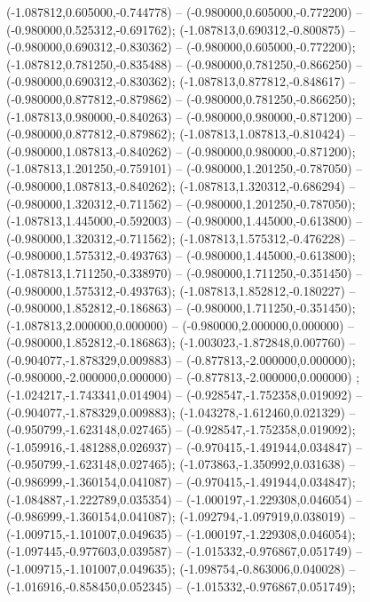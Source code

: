  (-1.087812,0.605000,-0.744778) -- (-0.980000,0.605000,-0.772200) -- (-0.980000,0.525312,-0.691762);
 (-1.087813,0.690312,-0.800875) -- (-0.980000,0.690312,-0.830362) -- (-0.980000,0.605000,-0.772200);
 (-1.087812,0.781250,-0.835488) -- (-0.980000,0.781250,-0.866250) -- (-0.980000,0.690312,-0.830362);
 (-1.087813,0.877812,-0.848617) -- (-0.980000,0.877812,-0.879862) -- (-0.980000,0.781250,-0.866250);
 (-1.087813,0.980000,-0.840263) -- (-0.980000,0.980000,-0.871200) -- (-0.980000,0.877812,-0.879862);
 (-1.087813,1.087813,-0.810424) -- (-0.980000,1.087813,-0.840262) -- (-0.980000,0.980000,-0.871200);
 (-1.087813,1.201250,-0.759101) -- (-0.980000,1.201250,-0.787050) -- (-0.980000,1.087813,-0.840262);
 (-1.087813,1.320312,-0.686294) -- (-0.980000,1.320312,-0.711562) -- (-0.980000,1.201250,-0.787050);
 (-1.087813,1.445000,-0.592003) -- (-0.980000,1.445000,-0.613800) -- (-0.980000,1.320312,-0.711562);
 (-1.087813,1.575312,-0.476228) -- (-0.980000,1.575312,-0.493763) -- (-0.980000,1.445000,-0.613800);
 (-1.087813,1.711250,-0.338970) -- (-0.980000,1.711250,-0.351450) -- (-0.980000,1.575312,-0.493763);
 (-1.087813,1.852812,-0.180227) -- (-0.980000,1.852812,-0.186863) -- (-0.980000,1.711250,-0.351450);
 (-1.087813,2.000000,0.000000) -- (-0.980000,2.000000,0.000000) -- (-0.980000,1.852812,-0.186863);
 (-1.003023,-1.872848,0.007760) -- (-0.904077,-1.878329,0.009883) -- (-0.877813,-2.000000,0.000000);
 (-0.980000,-2.000000,0.000000) -- (-0.877813,-2.000000,0.000000) ;
 (-1.024217,-1.743341,0.014904) -- (-0.928547,-1.752358,0.019092) -- (-0.904077,-1.878329,0.009883);
 (-1.043278,-1.612460,0.021329) -- (-0.950799,-1.623148,0.027465) -- (-0.928547,-1.752358,0.019092);
 (-1.059916,-1.481288,0.026937) -- (-0.970415,-1.491944,0.034847) -- (-0.950799,-1.623148,0.027465);
 (-1.073863,-1.350992,0.031638) -- (-0.986999,-1.360154,0.041087) -- (-0.970415,-1.491944,0.034847);
 (-1.084887,-1.222789,0.035354) -- (-1.000197,-1.229308,0.046054) -- (-0.986999,-1.360154,0.041087);
 (-1.092794,-1.097919,0.038019) -- (-1.009715,-1.101007,0.049635) -- (-1.000197,-1.229308,0.046054);
 (-1.097445,-0.977603,0.039587) -- (-1.015332,-0.976867,0.051749) -- (-1.009715,-1.101007,0.049635);
 (-1.098754,-0.863006,0.040028) -- (-1.016916,-0.858450,0.052345) -- (-1.015332,-0.976867,0.051749);

